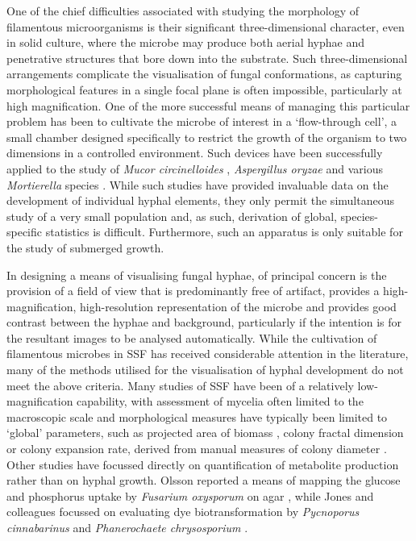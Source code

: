 One of the chief difficulties associated with studying the morphology of filamentous microorganisms is their significant three-dimensional character, even in solid culture, where the microbe may produce both aerial hyphae and penetrative structures that bore down into the substrate. Such three-dimensional arrangements complicate the visualisation of fungal conformations, as capturing morphological features in a single focal plane is often impossible, particularly at high magnification. One of the more successful means of managing this particular problem has been to cultivate the microbe of interest in a \lq flow-through cell', a small chamber designed specifically to restrict the growth of the organism to two dimensions in a controlled environment. Such devices have been successfully applied to the study of \emph{Mucor circinelloides} \cite{lubbehusen2003,lubbehusen2004}, \emph{Aspergillus oryzae} \cite{spohr1998,muller2002,pollack2008} and various \emph{Mortierella} species \cite{eypark2002,eypark2006}. While such studies have provided invaluable data on the development of individual hyphal elements, they only permit the simultaneous study of a very small population and, as such, derivation of global, species-specific statistics is difficult. Furthermore, such an apparatus is only suitable for the study of submerged growth.

In designing a means of visualising fungal hyphae, of principal concern is the provision of a field of view that is predominantly free of artifact, provides a high-magnification, high-resolution representation of the microbe and provides good contrast between the hyphae and background, particularly if the intention is for the resultant images to be analysed automatically. While the cultivation of filamentous microbes in SSF has received considerable attention in the literature, many of the methods utilised for the visualisation of hyphal development do not meet the above criteria. Many studies of SSF have been of a relatively low-magnification capability, with assessment of mycelia often limited to the macroscopic scale and morphological measures have typically been limited to \lq global' parameters, such as projected area of biomass \cite{kampichler2004,couri2006}, colony fractal dimension \cite{wells1998,kampichler2004} or colony expansion rate, derived from manual measures of colony diameter \cite{marin1998,kampichler2004,rahardjo2005b,golinski2008}. Other studies have focussed directly on quantification of metabolite production rather than on hyphal growth. Olsson reported a means of mapping the glucose and phosphorus uptake by \emph{Fusarium oxysporum} on agar \cite{olsson1994}, while Jones and colleagues focussed on evaluating dye biotransformation by \emph{Pycnoporus cinnabarinus} and \emph{Phanerochaete chrysosporium} \cite{jones1993b}. 


